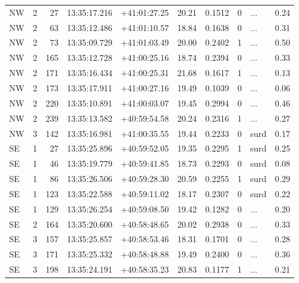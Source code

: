 \begin{tabular}{lrrllrrrlr}
  NW &       2 &     27 &  13:35:17.216 &  +41:01:27.25 &  20.21 &    0.1512 &  0 &        ... &        0.24 \\
  NW &       2 &     63 &  13:35:12.486 &  +41:01:10.57 &  18.84 &    0.1638 &  0 &        ... &        0.31 \\
  NW &       2 &     73 &  13:35:09.729 &  +41:01:03.49 &  20.00 &    0.2402 &  1 &        ... &        0.50 \\
  NW &       2 &    165 &  13:35:12.728 &  +41:00:25.16 &  18.74 &    0.2394 &  0 &        ... &        0.33 \\
  NW &       2 &    171 &  13:35:16.434 &  +41:00:25.31 &  21.68 &    0.1617 &  1 &        ... &        0.13 \\
  NW &       2 &    173 &  13:35:17.911 &  +41:00:27.16 &  19.49 &    0.1039 &  0 &        ... &        0.06 \\
  NW &       2 &    220 &  13:35:10.891 &  +41:00:03.07 &  19.45 &    0.2994 &  0 &        ... &        0.46 \\
  NW &       2 &    239 &  13:35:13.582 &  +40:59:54.58 &  20.24 &    0.2316 &  1 &        ... &        0.27 \\
  NW &       3 &    142 &  13:35:16.981 &  +41:00:35.55 &  19.44 &    0.2233 &  0 &       surd &        0.17 \\
  SE &       1 &     27 &  13:35:25.896 &  +40:59:52.05 &  19.35 &    0.2295 &  1 &       surd &        0.25 \\
  SE &       1 &     46 &  13:35:19.779 &  +40:59:41.85 &  18.73 &    0.2293 &  0 &       surd &        0.08 \\
  SE &       1 &     86 &  13:35:26.506 &  +40:59:28.30 &  20.59 &    0.2255 &  1 &       surd &        0.29 \\
  SE &       1 &    123 &  13:35:22.588 &  +40:59:11.02 &  18.17 &    0.2307 &  0 &       surd &        0.22 \\
  SE &       1 &    129 &  13:35:26.254 &  +40:59:08.50 &  19.42 &    0.1282 &  0 &        ... &        0.20 \\
  SE &       2 &    164 &  13:35:20.600 &  +40:58:48.65 &  20.02 &    0.2938 &  0 &        ... &        0.33 \\
  SE &       3 &    157 &  13:35:25.857 &  +40:58:53.46 &  18.31 &    0.1701 &  0 &        ... &        0.28 \\
  SE &       3 &    171 &  13:35:25.332 &  +40:58:48.88 &  19.49 &    0.2400 &  0 &        ... &        0.36 \\
  SE &       3 &    198 &  13:35:24.191 &  +40:58:35.23 &  20.83 &    0.1177 &  1 &        ... &        0.21 \\

\end{tabular}
